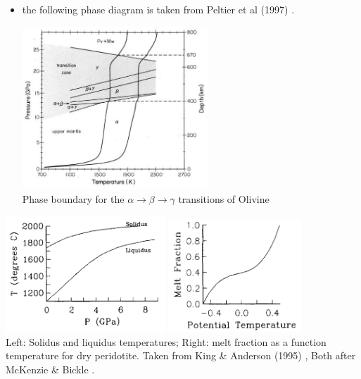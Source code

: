 \begin{itemize}
The obvious problem with this otherwise simple approach is that density varies in the domain but 
is not accompanied by a volume change so that it violates mass conservation.

\item the following phase diagram is taken from Peltier et al (1997) \cite{pebs97}.

\begin{center}
\includegraphics[width=7cm]{images/phasetransitions/pebs97}\\
{\captionfont Phase boundary for the $\alpha \rightarrow \beta \rightarrow \gamma$ transitions of 
Olivine}
\end{center}


\end{itemize}


\begin{center}
\includegraphics[width=6cm]{images/phasetransitions/kian95a}
\includegraphics[width=5cm]{images/phasetransitions/kian95b}\\
{\captionfont Left: Solidus and liquidus temperatures; 
Right: melt fraction as a function temperature for dry peridotite.
Taken from King \& Anderson (1995) \cite{kian95}, 
Both after McKenzie \& Bickle \cite{mcbi88}.}
\end{center}

